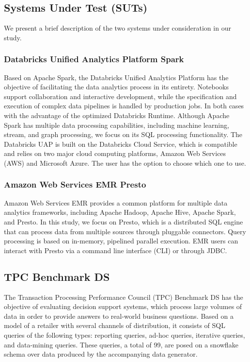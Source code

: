 \subsection{Systems Under Test (SUTs)}
We present a brief description of the two systems under consideration in our study.

\subsubsection{Databricks Unified Analytics Platform Spark}
Based on Apache Spark, the Databricks Unified Analytics Platform has the objective of facilitating the data analytics process in its entirety. Notebooks support collaboration and interactive development, while the specification and execution of complex data pipelines is handled by production jobs. In both cases with the advantage of the optimized Databricks Runtime. Although Apache Spark has multiple data processing capabilities, including machine learning, stream, and graph processing, we focus on its SQL processing functionality. The Databricks UAP is built on the Databricks Cloud Service, which is compatible and relies on two major cloud computing platforms, Amazon Web Services (AWS) and Microsoft Azure. The user has the option to choose which one to use.

\subsubsection{Amazon Web Services EMR Presto}
Amazon Web Services EMR provides a common platform for multiple data analytics frameworks, including Apache Hadoop, Apache Hive, Apache Spark, and Presto. In this study, we focus on Presto, which is a distributed SQL engine that can process data from multiple sources through pluggable connectors. Query processing is based on in-memory, pipelined parallel execution. EMR users can interact with Presto via a command line interface (CLI) or through JDBC.

\subsection{TPC Benchmark DS}
The Transaction Processing Performance Council (TPC) Benchmark DS \cite{tpcdsSpec} has the objective of evaluating decision support systems, which process large volumes of data in order to provide answers to real-world business questions. Based on a model of a retailer with several channels of distribution, it consists of SQL queries of the following types: reporting queries, ad-hoc queries, iterative queries, and data-mining queries. These queries, a total of 99, are posed on a snowflake schema over data produced by the accompanying data generator.

